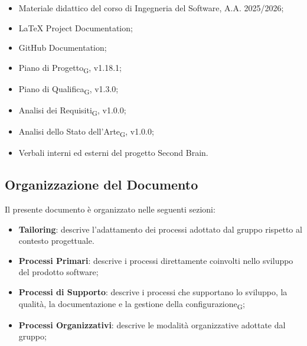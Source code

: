 \begin{itemize}

    \item Materiale didattico del corso di Ingegneria del Software, A.A. 2025/2026;

    \item
    {\LaTeX{} Project Documentation};

    \item
    {GitHub Documentation};

    \item
    {Piano di Progetto\textsubscript{G}, v1.18.1};

    \item
    {Piano di Qualifica\textsubscript{G}, v1.3.0};

    \item
    {Analisi dei Requisiti\textsubscript{G}, v1.0.0};

    \item
    {Analisi dello Stato dell'Arte\textsubscript{G}, v1.0.0};

    \item Verbali interni ed esterni del progetto Second Brain.

\end{itemize}


\subsection{Organizzazione del Documento}

Il presente documento è organizzato nelle seguenti sezioni:

\begin{itemize}
      \item \textbf{Tailoring}: descrive l'adattamento dei processi adottato dal gruppo rispetto al contesto progettuale.

      \item \textbf{Processi Primari}: descrive i processi direttamente coinvolti nello sviluppo del prodotto software;

      \item \textbf{Processi di Supporto}: descrive i processi che supportano lo sviluppo, la qualità, la documentazione e la gestione della configurazione\textsubscript{G};

      \item \textbf{Processi Organizzativi}: descrive le modalità organizzative adottate dal gruppo;
\end{itemize}